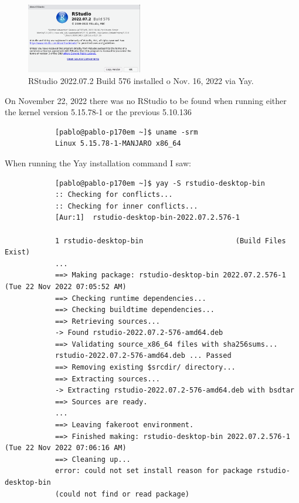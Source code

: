 \documentclass[]{scrartcl}
\begin{document}
	\begin{figure}[!htb]
	\centering
	\caption{RStudio 2022.07.2 Build 576 installed o Nov. 16, 2022 via Yay.}
	\includegraphics[width=0.45\textwidth]{Images/RStudioSplashWindowNov-16-2022.png}
	\end{figure}
	
	
	On November 22, 2022 there was no RStudio to be found when running either the kernel
	version 5.15.78-1 or the previous 5.10.136
	
	\begin{small}
		\begin{verbatim}
			[pablo@pablo-p170em ~]$ uname -srm
			Linux 5.15.78-1-MANJARO x86_64
		\end{verbatim}
	\end{small}
	
	When running the Yay installation command I saw:
	
	\begin{small}
		\begin{verbatim}
			[pablo@pablo-p170em ~]$ yay -S rstudio-desktop-bin
			:: Checking for conflicts...
			:: Checking for inner conflicts...
			[Aur:1]  rstudio-desktop-bin-2022.07.2.576-1
			
			1 rstudio-desktop-bin                      (Build Files Exist)
			...
			==> Making package: rstudio-desktop-bin 2022.07.2.576-1 (Tue 22 Nov 2022 07:05:52 AM)
			==> Checking runtime dependencies...
			==> Checking buildtime dependencies...
			==> Retrieving sources...
			-> Found rstudio-2022.07.2-576-amd64.deb
			==> Validating source_x86_64 files with sha256sums...
			rstudio-2022.07.2-576-amd64.deb ... Passed
			==> Removing existing $srcdir/ directory...
			==> Extracting sources...
			-> Extracting rstudio-2022.07.2-576-amd64.deb with bsdtar
			==> Sources are ready.
			...
			==> Leaving fakeroot environment.
			==> Finished making: rstudio-desktop-bin 2022.07.2.576-1 (Tue 22 Nov 2022 07:06:16 AM)
			==> Cleaning up...
			error: could not set install reason for package rstudio-desktop-bin 
			(could not find or read package)
		\end{verbatim}
	\end{small}
	
\end{document}

